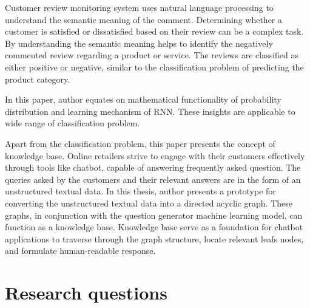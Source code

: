  Customer review monitoring system uses natural language processing to understand the semantic meaning of the comment. Determining whether a customer is satisfied or dissatisfied based on their review can be a complex task. By understanding the semantic meaning helps to identify the negatively commented review regarding a product or service. The reviews are classified as either positive or negative, similar to the classification problem of predicting the product category. 
 
 In this paper, author equates on mathematical functionality of probability distribution and learning mechanism of \acl*{RNN}. These insights are applicable to wide range of classification problem.

 Apart from the classification problem, this paper presents the concept of knowledge base. Online retailers strive to engage with their customers effectively through tools like chatbot, capable of  answering frequently asked question. The queries asked by the customers and their relevant answers are in the form of an unstructured textual data. In this thesis, author presents a prototype for converting the unstructured textual data into a directed acyclic graph. These graphs, in conjunction with the question generator machine learning model,  can function as a knowledge base. Knowledge base serve as a foundation for chatbot applications to traverse through the graph structure, locate relevant leafs nodes, and formulate human-readable response.

\section{Research questions}

